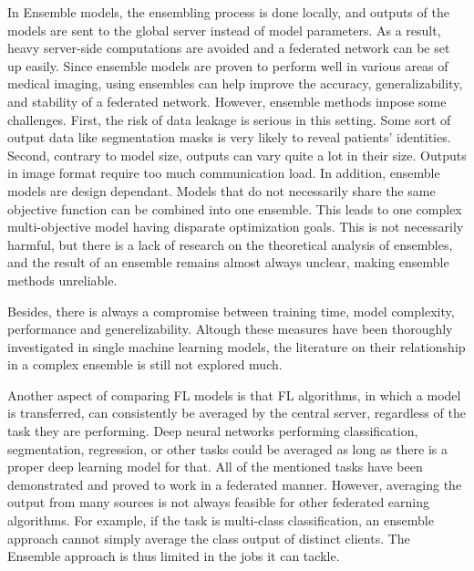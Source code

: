 In Ensemble models, the ensembling process is done locally, and outputs of the models are sent to the global server instead of model parameters. As a result, heavy server-side computations are avoided and a federated network can be set up easily. Since ensemble models are proven to perform well in various areas of medical imaging, using ensembles can help improve the accuracy, generalizability, and stability of a federated network. However, ensemble methods impose some challenges. First, the risk of data leakage is serious in this setting. Some sort of output data like segmentation masks is very likely to reveal patients' identities. Second, contrary to model size, outputs can vary quite a lot in their size. Outputs in image format require too much communication load. 
In addition, ensemble models are design dependant. Models that do not necessarily share the same objective function can be combined into one ensemble. This leads to one complex multi-objective model having disparate optimization goals. This is not necessarily harmful, but there is a lack of research on the theoretical analysis of ensembles, and the result of an ensemble remains almost always unclear, making ensemble methods unreliable.

Besides, there is always a compromise between training time, model complexity, performance and generelizability. Altough these measures have been thoroughly investigated in single machine learning models, the literature on their relationship in a complex ensemble is still not explored much.



Another aspect of comparing FL models is that FL algorithms, in which a model is transferred, can consistently be averaged by the central server, regardless of the task they are performing. Deep neural networks performing classification, segmentation, regression, or other tasks could be averaged as long as there is a proper deep learning model for that.  All of the mentioned tasks have been demonstrated and proved to work in a federated manner. However, averaging the output from many sources is not always feasible for other federated earning algorithms. For example, if the task is multi-class classification, an ensemble approach cannot simply average the class output of distinct clients. The Ensemble approach is thus limited in the jobs it can tackle.


